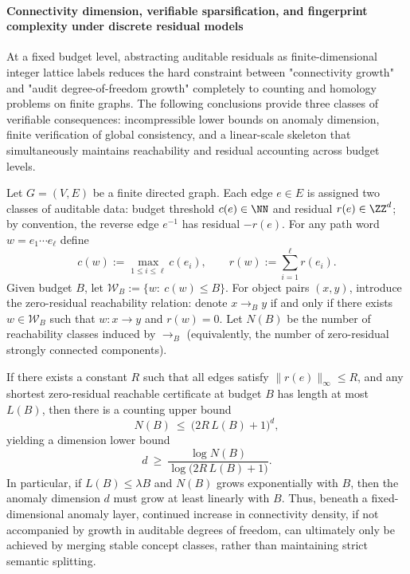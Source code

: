 
\paragraph{Connectivity dimension, verifiable sparsification, and fingerprint complexity under discrete residual models}
At a fixed budget level, abstracting auditable residuals as finite-dimensional integer lattice labels reduces the hard constraint between "connectivity growth" and "audit degree-of-freedom growth" completely to counting and homology problems on finite graphs.
The following conclusions provide three classes of verifiable consequences: incompressible lower bounds on anomaly dimension, finite verification of global consistency, and a linear-scale skeleton that simultaneously maintains reachability and residual accounting across budget levels.

\begin{conclusion}\label{con:xi-stable-concept-entropy-anom-dimension-lower-bound}
Let \(G=(V,E)\) be a finite directed graph.
Each edge \(e\in E\) is assigned two classes of auditable data: budget threshold \(c(e)\in\NN\) and residual \(r(e)\in\ZZ^d\);
by convention, the reverse edge \(e^{-1}\) has residual \(-r(e)\).
For any path word \(w=e_1\cdots e_\ell\) define
\[
c(w):=\max_{1\le i\le \ell} c(e_i),
\qquad
r(w):=\sum_{i=1}^{\ell} r(e_i).
\]
Given budget \(B\), let \(\mathcal{W}_B:=\{w:\ c(w)\le B\}\).
For object pairs \((x,y)\), introduce the zero-residual reachability relation: denote \(x\to_B y\) if and only if there exists \(w\in\mathcal{W}_B\) such that \(w:x\to y\) and \(r(w)=0\).
Let \(N(B)\) be the number of reachability classes induced by \(\to_B\) (equivalently, the number of zero-residual strongly connected components).

If there exists a constant \(R\) such that all edges satisfy \(\|r(e)\|_\infty\le R\), and any shortest zero-residual reachable certificate at budget \(B\) has length at most \(L(B)\),
then there is a counting upper bound
\[
N(B)\ \le\ \bigl(2R\,L(B)+1\bigr)^d,
\]
yielding a dimension lower bound
\[
d\ \ge\ \frac{\log N(B)}{\log\bigl(2R\,L(B)+1\bigr)}.
\]
In particular, if \(L(B)\le \lambda B\) and \(N(B)\) grows exponentially with \(B\), then the anomaly dimension \(d\) must grow at least linearly with \(B\).
Thus, beneath a fixed-dimensional anomaly layer, continued increase in connectivity density, if not accompanied by growth in auditable degrees of freedom, can ultimately only be achieved by merging stable concept classes, rather than maintaining strict semantic splitting.
\end{conclusion}

